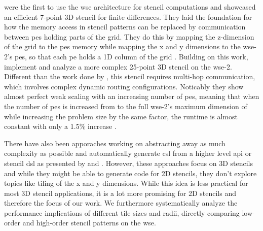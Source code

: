 \textcite{rocki2020fast} were the first to use the \ac{wse} architecture for stencil computations and showcased an efficient 7-point 3D stencil for finite differences.
They laid the foundation for how the memory access in stencil patterns can be replaced by communication between \ac{pe}s holding parts of the grid. They do this by mapping the z-dimension of the grid to the \ac{pe}s memory while mapping the x and y dimensions to the \ac{wse}-2's \ac{pe}s, so that each \ac{pe} holds a 1D column of the grid \cite{rocki2020fast}.
Building on this work, \textcite{jacquelin2022massively} implement and analyze a more complex 25-point 3D stencil on the \ac{wse}-2. Different than the work done by \textcite{rocki2020fast}, this stencil requires multi-hop communication, which involves complex dynamic routing configurations.
Noticably they show almost perfect weak scaling with an increasing number of \ac{pe}s, meaning that when the number of \ac{pe}s is increased from  to the full \ac{wse}-2's maximum dimension of  while increasing the problem size by the same factor, the runtime is almost constant with only a 1.5\% increase \cite{jacquelin2022massively}.

There have also been apporaches working on abstracting away as much complexity as possible and automatically generate \ac{csl} from a higher level \ac{api} or stencil \ac{dsl} as presented by \textcite{woo2022disruptive} and \textcite{sai2024automated} \cite{woo2022disruptive,sai2024automated}. However, these approaches focus on 3D stencils and while they might be able to generate code for 2D stencils, they don't explore topics like tiling of the x and y dimensions. While this idea is less practical for most 3D stencil applications, it is a lot more promising for 2D stencils and therefore the focus of our work. We furthermore systematically analyze the performance implications of different tile sizes and radii, directly comparing low-order and high-order stencil patterns on the \ac{wse}.